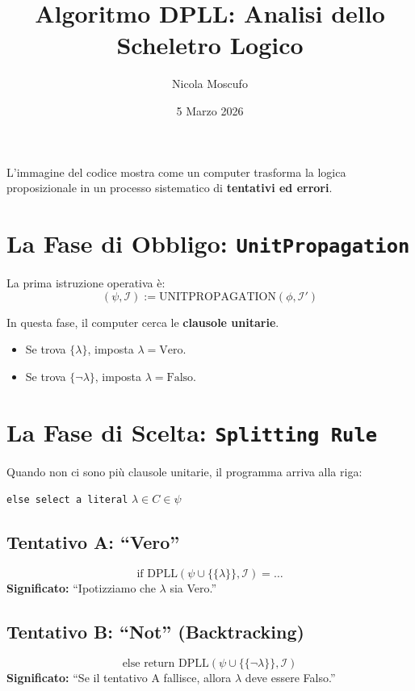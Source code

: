 \documentclass[12pt,a4paper]{article}
\title{Algoritmo DPLL: Analisi dello Scheletro Logico}
\author{Nicola Moscufo}
\date{5 Marzo 2026}
\begin{document}
\maketitle

L'immagine del codice mostra come un computer trasforma la logica proposizionale in un processo sistematico di \textbf{tentativi ed errori}.

\section{La Fase di Obbligo: \texttt{UnitPropagation}}
La prima istruzione operativa è:
\[ (\psi, \mathcal{I}) := \text{UNITPROPAGATION}(\phi, \mathcal{I}') \]

\begin{tcolorbox}[colback=blue!5!white,colframe=blue!75!black,title=Regola 1: La Scelta Forzata]
In questa fase, il computer cerca le \textbf{clausole unitarie}.
\begin{itemize}
    \item Se trova $\{ \lambda \}$, imposta $\lambda = \text{Vero}$.
    \item Se trova $\{ \neg \lambda \}$, imposta $\lambda = \text{Falso}$.
\end{itemize}
\end{tcolorbox}

\section{La Fase di Scelta: \texttt{Splitting Rule}}
Quando non ci sono più clausole unitarie, il programma arriva alla riga:
\begin{center}
    \texttt{else select a literal} $\lambda \in C \in \psi$
\end{center}

\subsection*{Tentativo A: ``Vero''}
\[ \text{if DPLL}(\psi \cup \{\{\lambda\}\}, \mathcal{I}) = \dots \]
\textbf{Significato:} ``Ipotizziamo che $\lambda$ sia Vero.''

\subsection*{Tentativo B: ``Not'' (Backtracking)}
\[ \text{else return DPLL}(\psi \cup \{\{\neg \lambda\}\}, \mathcal{I}) \]
\textbf{Significato:} ``Se il tentativo A fallisce, allora $\lambda$ deve essere Falso.''
\end{document}
